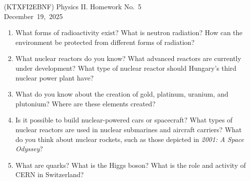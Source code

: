 \documentclass[a4paper,12pt]{letter}
\begin{document}
\begin{center}
  (KTXFI2EBNF) Physics II. Homework No.~5\\ \smallskip
 December~19,~2025
 \end{center}

\begin{enumerate}
\item What forms of radioactivity exist? What is neutron radiation? How can the environment be protected from different forms of radiation?

\item What nuclear reactors do you know? What advanced reactors are currently under development? What type of nuclear reactor should Hungary’s third nuclear power plant have?

\item What do you know about the creation of gold, platinum, uranium, and plutonium? Where are these elements created?

\item Is it possible to build nuclear-powered cars or spacecraft? What types of nuclear reactors are used in nuclear submarines and aircraft carriers? What do you think about nuclear rockets, such as those depicted in \emph{2001: A Space Odyssey}?

\item What are quarks? What is the Higgs boson? What is the role and activity of CERN in Switzerland?
\end{enumerate}


\bigskip


\vfill
\end{document}

